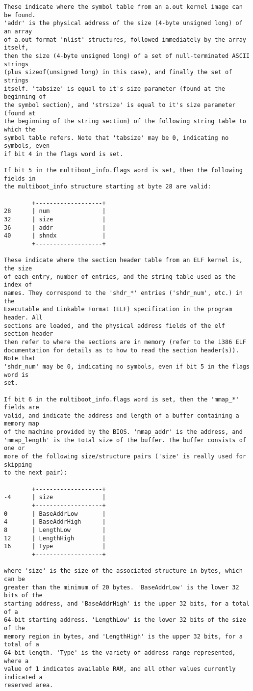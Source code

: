 \begin{verbatim}
These indicate where the symbol table from an a.out kernel image can be found.
'addr' is the physical address of the size (4-byte unsigned long) of an array
of a.out-format 'nlist' structures, followed immediately by the array itself,
then the size (4-byte unsigned long) of a set of null-terminated ASCII strings
(plus sizeof(unsigned long) in this case), and finally the set of strings
itself. 'tabsize' is equal to it's size parameter (found at the beginning of
the symbol section), and 'strsize' is equal to it's size parameter (found at
the beginning of the string section) of the following string table to which the
symbol table refers. Note that 'tabsize' may be 0, indicating no symbols, even
if bit 4 in the flags word is set.

If bit 5 in the multiboot_info.flags word is set, then the following fields in
the multiboot_info structure starting at byte 28 are valid:

        +-------------------+
28      | num               |
32      | size              |
36      | addr              |
40      | shndx             |
        +-------------------+

These indicate where the section header table from an ELF kernel is, the size
of each entry, number of entries, and the string table used as the index of
names. They correspond to the 'shdr_*' entries ('shdr_num', etc.) in the
Executable and Linkable Format (ELF) specification in the program header. All
sections are loaded, and the physical address fields of the elf section header
then refer to where the sections are in memory (refer to the i386 ELF
documentation for details as to how to read the section header(s)). Note that
'shdr_num' may be 0, indicating no symbols, even if bit 5 in the flags word is
set.

If bit 6 in the multiboot_info.flags word is set, then the 'mmap_*' fields are
valid, and indicate the address and length of a buffer containing a memory map
of the machine provided by the BIOS. 'mmap_addr' is the address, and
'mmap_length' is the total size of the buffer. The buffer consists of one or
more of the following size/structure pairs ('size' is really used for skipping
to the next pair):

        +-------------------+
-4      | size              |
        +-------------------+
0       | BaseAddrLow       |
4       | BaseAddrHigh      |
8       | LengthLow         |
12      | LengthHigh        |
16      | Type              |
        +-------------------+

where 'size' is the size of the associated structure in bytes, which can be
greater than the minimum of 20 bytes. 'BaseAddrLow' is the lower 32 bits of the
starting address, and 'BaseAddrHigh' is the upper 32 bits, for a total of a
64-bit starting address. 'LengthLow' is the lower 32 bits of the size of the
memory region in bytes, and 'LengthHigh' is the upper 32 bits, for a total of a
64-bit length. 'Type' is the variety of address range represented, where a
value of 1 indicates available RAM, and all other values currently indicated a
reserved area.


\end{verbatim}

